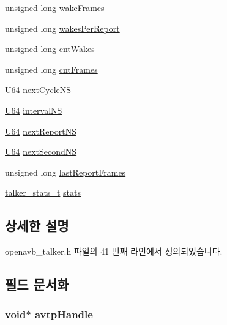 \begin{DoxyCompactItemize}
\item 
unsigned long \hyperlink{structtalker__data__t_a89864f8fd627d63b752a2edca16bda66}{wake\+Frames}
\item 
unsigned long \hyperlink{structtalker__data__t_a0d3335b6780650fc534470f66692e6fd}{wakes\+Per\+Report}
\item 
unsigned long \hyperlink{structtalker__data__t_aac58e4369721569b14577c867c852feb}{cnt\+Wakes}
\item 
unsigned long \hyperlink{structtalker__data__t_aba2cd205107b713b2d945cbb84442316}{cnt\+Frames}
\item 
\hyperlink{openavb__types__base__pub_8h_a25809e0734a149248fcf5831efa4e33d}{U64} \hyperlink{structtalker__data__t_a50f30f37b36cd7b3518289897953a685}{next\+Cycle\+NS}
\item 
\hyperlink{openavb__types__base__pub_8h_a25809e0734a149248fcf5831efa4e33d}{U64} \hyperlink{structtalker__data__t_a94f53f00878c9928b413df5a29abbe38}{interval\+NS}
\item 
\hyperlink{openavb__types__base__pub_8h_a25809e0734a149248fcf5831efa4e33d}{U64} \hyperlink{structtalker__data__t_a9ed17cd4b781b5f67b657069d5b4382f}{next\+Report\+NS}
\item 
\hyperlink{openavb__types__base__pub_8h_a25809e0734a149248fcf5831efa4e33d}{U64} \hyperlink{structtalker__data__t_af7e8f07dc431af3a82b4ee9b960772ce}{next\+Second\+NS}
\item 
unsigned long \hyperlink{structtalker__data__t_afcd18ba6ccac35cfc976d61591b8a718}{last\+Report\+Frames}
\item 
\hyperlink{structtalker__stats__t}{talker\+\_\+stats\+\_\+t} \hyperlink{structtalker__data__t_ad690691ca7f6f435d5ade9ccfcaa211d}{stats}
\end{DoxyCompactItemize}


\subsection{상세한 설명}


openavb\+\_\+talker.\+h 파일의 41 번째 라인에서 정의되었습니다.



\subsection{필드 문서화}
\subsubsection[{\texorpdfstring{avtp\+Handle}{avtpHandle}}]{\setlength{\rightskip}{0pt plus 5cm}void$\ast$ avtp\+Handle}\hypertarget{structtalker__data__t_a4b9351eb0c3d027b65d2babae355d2c1}{}\label{structtalker__data__t_a4b9351eb0c3d027b65d2babae355d2c1}


